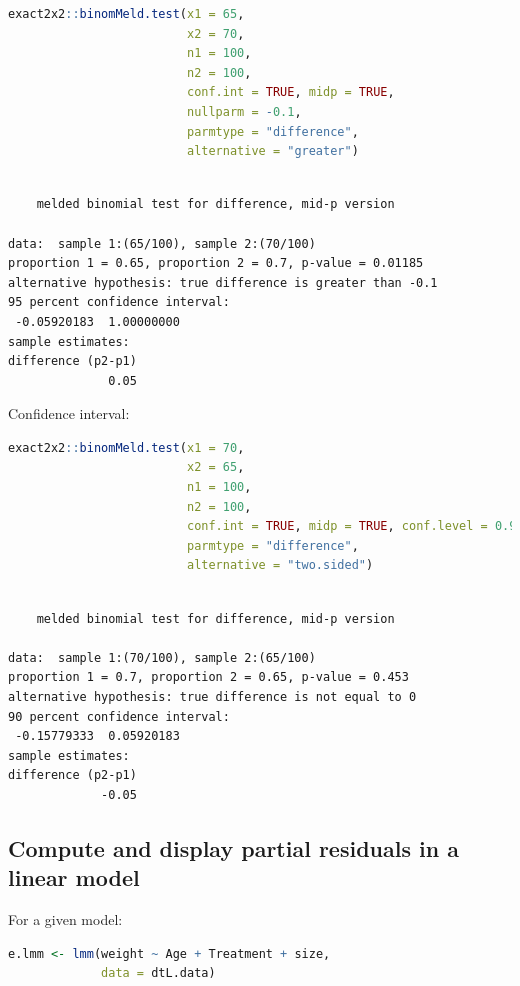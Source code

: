 \documentclass{article}
\begin{document}
\begin{lstlisting}[language=r,numbers=none]
exact2x2::binomMeld.test(x1 = 65,
                         x2 = 70,
                         n1 = 100,
                         n2 = 100,
                         conf.int = TRUE, midp = TRUE,
                         nullparm = -0.1,
                         parmtype = "difference",
                         alternative = "greater")
\end{lstlisting}

\label{}
\begin{verbatim}

	melded binomial test for difference, mid-p version

data:  sample 1:(65/100), sample 2:(70/100)
proportion 1 = 0.65, proportion 2 = 0.7, p-value = 0.01185
alternative hypothesis: true difference is greater than -0.1
95 percent confidence interval:
 -0.05920183  1.00000000
sample estimates:
difference (p2-p1) 
              0.05
\end{verbatim}

Confidence interval:
\begin{lstlisting}[language=r,numbers=none]
exact2x2::binomMeld.test(x1 = 70,
                         x2 = 65,
                         n1 = 100,
                         n2 = 100,
                         conf.int = TRUE, midp = TRUE, conf.level = 0.90,
                         parmtype = "difference",
                         alternative = "two.sided")
\end{lstlisting}

\label{}
\begin{verbatim}

	melded binomial test for difference, mid-p version

data:  sample 1:(70/100), sample 2:(65/100)
proportion 1 = 0.7, proportion 2 = 0.65, p-value = 0.453
alternative hypothesis: true difference is not equal to 0
90 percent confidence interval:
 -0.15779333  0.05920183
sample estimates:
difference (p2-p1) 
             -0.05
\end{verbatim}
\subsection{Compute and display partial residuals in a linear model}
\label{sec:org1dac066}

For a given model:
\begin{lstlisting}[language=r,numbers=none]
e.lmm <- lmm(weight ~ Age + Treatment + size,
             data = dtL.data)
\end{lstlisting}
\end{document}
